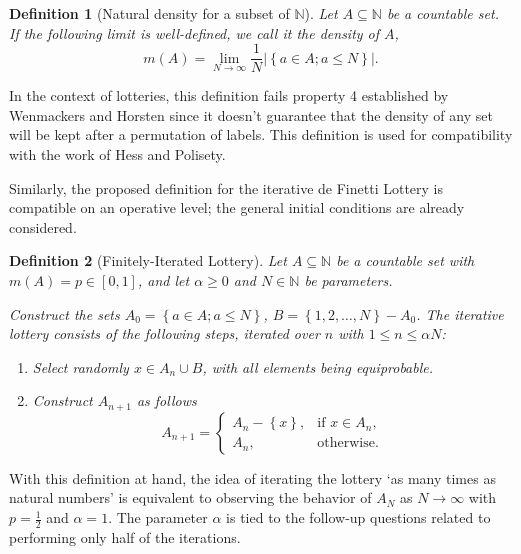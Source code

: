 \documentclass{article}
\newtheorem{definition}{Definition}
\newcommand{\N}{\mathbb{N}}
\newcommand{\card}[1]{\left| #1 \right|}
\newcommand{\sset}[1]{\left\{ #1 \right\}}
\newcommand{\ppar}[1]{\left( #1 \right)}
\begin{document}
\begin{definition}[Natural density for a subset of $\N$]
Let $A \subseteq \N$ be a countable set.
If the following limit is well-defined, we call it the density of $A$,
\begin{equation}
    m\ppar{A} = 
    \lim_{N\rightarrow \infty} \frac{1}{N} \card{ \sset{a\in A; a\leq N} }.
\end{equation}
\end{definition}

In the context of lotteries, this definition fails property 4 established by Wenmackers and Horsten since it doesn't guarantee that the density of any set will be kept after a permutation of labels.
%
This definition is used for compatibility with the work of Hess and Polisety.

Similarly, the proposed definition for the iterative de Finetti Lottery is compatible on an operative level; the general initial conditions are already considered.

\begin{definition}[Finitely-Iterated Lottery]
Let $A \subseteq \N$ be a countable set with $m\ppar{A} = p \in [0,1]$, and let $\alpha\geq 0$ and $N\in \N$ be parameters. 

Construct the sets $A_0 = \sset{a\in A; a\leq N}$, $B = \sset{1, 2, \dots, N} - A_0$.
%
The iterative lottery consists of the following steps, iterated over $n$ with $1\leq n\leq \alpha N$:
\begin{enumerate}
    \item Select randomly $x \in A_n \cup B$, with all elements being equiprobable.
    \item Construct $A_{n+1}$ as follows
    \begin{equation}
        A_{n+1} = \begin{cases}
            A_n-\sset{x}, &\text{if } x\in A_n, \\
            A_n, &\text{otherwise}.
        \end{cases}
    \end{equation}
\end{enumerate}
\end{definition}

With this definition at hand, the idea of iterating the lottery `as many times as natural numbers' is equivalent to observing the behavior of $A_{N}$ as $N \rightarrow \infty$ with $p=\frac{1}{2}$ and $\alpha=1$.
%
The parameter $\alpha$ is tied to the follow-up questions related to performing only half of the iterations.
\end{document}
